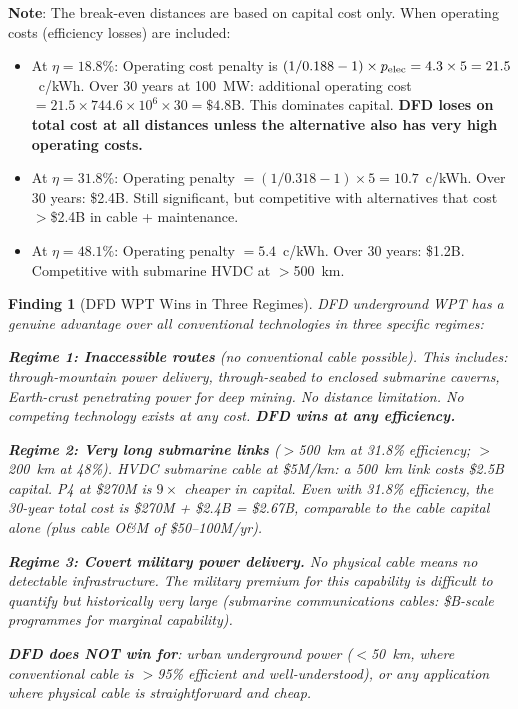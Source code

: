 \documentclass[11pt]{article}
\newtheorem{finding}{Finding}
\newcommand{\ee}[1]{\times 10^{#1}}
\begin{document}
\textbf{Note}: The break-even distances are based on capital cost only.
When operating costs (efficiency losses) are included:

\begin{itemize}[nosep]
\item At $\eta = 18.8\%$: Operating cost penalty is $(1/0.188 - 1)\times
  p_{\rm elec} = 4.3\times 5 = 21.5$~c/kWh. Over 30 years at 100~MW:
  additional operating cost $= 21.5\times 744.6\ee{6}\times 30 = \$4.8$B.
  This dominates capital. \textbf{DFD loses on total cost at all distances
  unless the alternative also has very high operating costs.}

\item At $\eta = 31.8\%$: Operating penalty $= (1/0.318 - 1)\times 5 =
  10.7$~c/kWh. Over 30 years: \$2.4B. Still significant, but competitive
  with alternatives that cost $>$\$2.4B in cable + maintenance.

\item At $\eta = 48.1\%$: Operating penalty $= 5.4$~c/kWh. Over 30 years:
  \$1.2B. Competitive with submarine HVDC at $>$500~km.
\end{itemize}

\begin{finding}[DFD WPT Wins in Three Regimes]
\label{find:competitive}
DFD underground WPT has a genuine advantage over all conventional
technologies in three specific regimes:

\textbf{Regime 1: Inaccessible routes} (no conventional cable possible).
This includes: through-mountain power delivery, through-seabed to
enclosed submarine caverns, Earth-crust penetrating power for deep mining.
No distance limitation. No competing technology exists at any cost.
\textbf{DFD wins at any efficiency.}

\textbf{Regime 2: Very long submarine links} ($>$500~km at 31.8\%
efficiency; $>$200~km at 48\%).
HVDC submarine cable at \$5M/km: a 500~km link costs \$2.5B capital.
P4 at \$270M is $9\times$ cheaper in capital. Even with 31.8\%
efficiency, the 30-year total cost is \$270M + \$2.4B = \$2.67B,
comparable to the cable capital alone (plus cable O\&M of \$50--100M/yr).

\textbf{Regime 3: Covert military power delivery.}
No physical cable means no detectable infrastructure. The military
premium for this capability is difficult to quantify but historically
very large (submarine communications cables: \$B-scale programmes for
marginal capability).

\textbf{DFD does NOT win for}: urban underground power ($<$50~km, where
conventional cable is $>$95\% efficient and well-understood), or any
application where physical cable is straightforward and cheap.
\end{finding}
\end{document}
